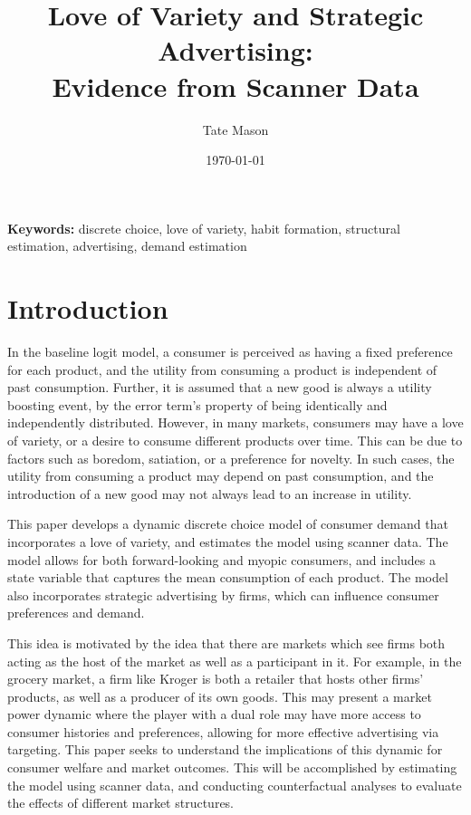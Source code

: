 \documentclass[12pt]{article}
\title{\textbf{Love of Variety and Strategic Advertising:\\
               Evidence from Scanner Data}}
\author[1]{Tate Mason}
\affil[1]{John Munro Godfrey Sr. Department of Economics, University of Georgia}
\date{\today}
\begin{document}
\maketitle

\begin{abstract}
\end{abstract}

\noindent\textbf{Keywords:} discrete choice, love of variety, habit formation,
                             structural estimation, advertising, demand estimation

\newpage

\section{Introduction}

In the baseline logit model, a consumer is perceived as having a fixed preference for each product, and the utility from consuming a product is independent of past consumption. Further, it is assumed that a new good is always a utility boosting event, by the error term's property of being identically and independently distributed. However, in many markets, consumers may have a love of variety, or a desire to consume different products over time. This can be due to factors such as boredom, satiation, or a preference for novelty. In such cases, the utility from consuming a product may depend on past consumption, and the introduction of a new good may not always lead to an increase in utility.

This paper develops a dynamic discrete choice model of consumer demand that incorporates a love of variety, and estimates the model using scanner data. The model allows for both forward-looking and myopic consumers, and includes a state variable that captures the mean consumption of each product. The model also incorporates strategic advertising by firms, which can influence consumer preferences and demand.

This idea is motivated by the idea that there are markets which see firms both acting as the host of the market as well as a participant in it. For example, in the grocery market, a firm like Kroger is both a retailer that hosts other firms' products, as well as a producer of its own goods. This may present a market power dynamic where the player with a dual role may have more access to consumer histories and preferences, allowing for more effective advertising via targeting. This paper seeks to understand the implications of this dynamic for consumer welfare and market outcomes. This will be accomplished by estimating the model using scanner data, and conducting counterfactual analyses to evaluate the effects of different market structures.
\end{document}
